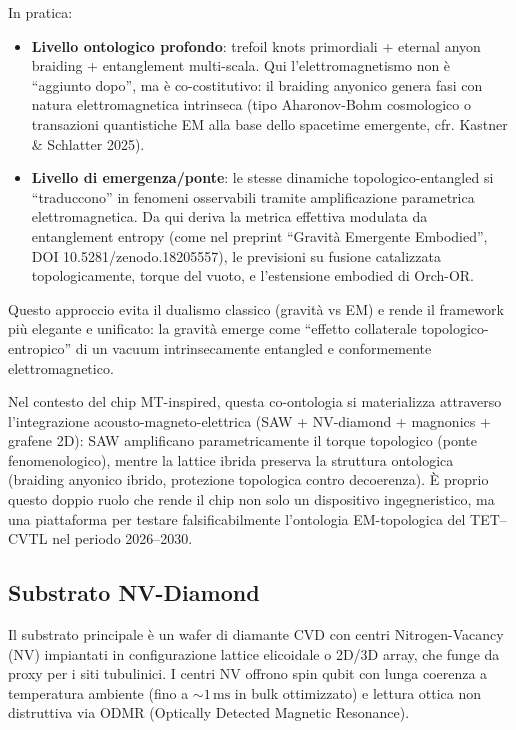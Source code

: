 \documentclass[12pt,a4paper]{article}
\begin{document}
In pratica:
\begin{itemize}
    \item \textbf{Livello ontologico profondo}: trefoil knots primordiali + eternal anyon braiding + entanglement multi-scala. Qui l'elettromagnetismo non è ``aggiunto dopo'', ma è co-costitutivo: il braiding anyonico genera fasi con natura elettromagnetica intrinseca (tipo Aharonov-Bohm cosmologico o transazioni quantistiche EM alla base dello spacetime emergente, cfr. Kastner \& Schlatter 2025).
    
    \item \textbf{Livello di emergenza/ponte}: le stesse dinamiche topologico-entangled si ``traduccono'' in fenomeni osservabili tramite amplificazione parametrica elettromagnetica. Da qui deriva la metrica effettiva modulata da entanglement entropy (come nel preprint ``Gravità Emergente Embodied'', DOI 10.5281/zenodo.18205557), le previsioni su fusione catalizzata topologicamente, torque del vuoto, e l'estensione embodied di Orch-OR.
\end{itemize}

Questo approccio evita il dualismo classico (gravità vs EM) e rende il framework più elegante e unificato: la gravità emerge come ``effetto collaterale topologico-entropico'' di un vacuum intrinsecamente entangled e conformemente elettromagnetico.

Nel contesto del chip MT-inspired, questa co-ontologia si materializza attraverso l'integrazione acousto-magneto-elettrica (SAW + NV-diamond + magnonics + grafene 2D): SAW amplificano parametricamente il torque topologico (ponte fenomenologico), mentre la lattice ibrida preserva la struttura ontologica (braiding anyonico ibrido, protezione topologica contro decoerenza). È proprio questo doppio ruolo che rende il chip non solo un dispositivo ingegneristico, ma una piattaforma per testare falsificabilmente l'ontologia EM-topologica del TET--CVTL nel periodo 2026--2030.



\subsection{Substrato NV-Diamond}

Il substrato principale è un wafer di diamante CVD con centri Nitrogen-Vacancy (NV) impiantati in configurazione lattice elicoidale o 2D/3D array, che funge da proxy per i siti tubulinici. I centri NV offrono spin qubit con lunga coerenza a temperatura ambiente (fino a $\sim 1\,\mathrm{ms}$ in bulk ottimizzato) e lettura ottica non distruttiva via ODMR (Optically Detected Magnetic Resonance).
\end{document}
